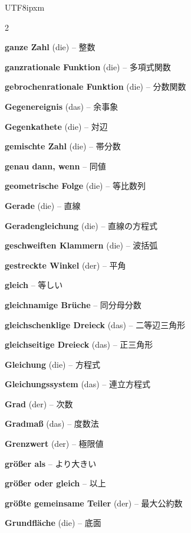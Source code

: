 \begin{CJK}{UTF8}{ipxm}
\begin{multicols}{2}
\par\nopagebreak
\textbf{ganze Zahl} (die) -- 整数\dotfill\hyperref[e:6]{\pageref*{e:6}}\par
\textbf{ganzrationale Funktion} (die) -- 多項式関数\dotfill\hyperref[e:126]{\pageref*{e:126}}\par
\textbf{gebrochenrationale Funktion} (die) -- 分数関数\dotfill\hyperref[e:127]{\pageref*{e:127}}\par
\textbf{Gegenereignis} (das) -- 余事象\dotfill\hyperref[e:329]{\pageref*{e:329}}\par
\textbf{Gegenkathete} (die) -- 対辺\dotfill\hyperref[e:189]{\pageref*{e:189}}\par
\textbf{gemischte Zahl} (die) -- 帯分数\dotfill\hyperref[e:33]{\pageref*{e:33}}\par
\textbf{genau dann, wenn} -- 同値\dotfill\hyperref[e:351]{\pageref*{e:351}}\par
\textbf{geometrische Folge} (die) -- 等比数列\dotfill\hyperref[e:260]{\pageref*{e:260}}\par
\textbf{Gerade} (die) -- 直線\dotfill\hyperref[e:147]{\pageref*{e:147}}\par
\textbf{Geradengleichung} (die) -- 直線の方程式\dotfill\hyperref[e:309]{\pageref*{e:309}}\par
\textbf{geschweiften Klammern} (die) -- 波括弧\dotfill\hyperref[e:90]{\pageref*{e:90}}\par
\textbf{gestreckte Winkel} (der) -- 平角\dotfill\hyperref[e:160]{\pageref*{e:160}}\par
\textbf{gleich} -- 等しい\dotfill\hyperref[e:60]{\pageref*{e:60}}\par
\textbf{gleichnamige Brüche} -- 同分母分数\dotfill\hyperref[e:34]{\pageref*{e:34}}\par
\textbf{gleichschenklige Dreieck} (das) -- 二等辺三角形\dotfill\hyperref[e:182]{\pageref*{e:182}}\par
\textbf{gleichseitige Dreieck} (das) -- 正三角形\dotfill\hyperref[e:185]{\pageref*{e:185}}\par
\textbf{Gleichung} (die) -- 方程式\dotfill\hyperref[e:76]{\pageref*{e:76}}\par
\textbf{Gleichungssystem} (das) -- 連立方程式\dotfill\hyperref[e:80]{\pageref*{e:80}}\par
\textbf{Grad} (der) -- 次数\dotfill\hyperref[e:75]{\pageref*{e:75}}\par
\textbf{Gradmaß} (das) -- 度数法\dotfill\hyperref[e:138]{\pageref*{e:138}}\par
\textbf{Grenzwert} (der) -- 極限値\dotfill\hyperref[e:264]{\pageref*{e:264}}\par
\textbf{größer als} -- より大きい\dotfill\hyperref[e:64]{\pageref*{e:64}}\par
\textbf{größer oder gleich} -- 以上\dotfill\hyperref[e:66]{\pageref*{e:66}}\par
\textbf{größte gemeinsame Teiler} (der) -- 最大公約数\dotfill\hyperref[e:56]{\pageref*{e:56}}\par
\textbf{Grundfläche} (die) -- 底面\dotfill\hyperref[e:248]{\pageref*{e:248}}\par


\end{multicols}
\end{CJK}
